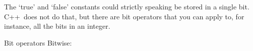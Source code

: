 The `true' and `false' constants could strictly speaking be stored in
a single bit. C++~does not do that, but there are bit
operators that you can apply to, for instance, all the bits in an integer.

\begin{block}{Bit operators}
  \label{sl:bit-oper}
 Bitwise: \n{& | ^}
\end{block}

\begin{comment}
  \Level 1 {Type conversions}

  Since a variable has one type, and will always be of that type,
  you may wonder what happens with
  \begin{lstlisting}
    float x = 1.5;
    int i;
    i = x;
  \end{lstlisting}
  or 
  \begin{lstlisting}
    int i = 6;
    float x;
    x = i;
  \end{lstlisting}

  \begin{itemize}
  \item Assigning a floating point value to an integer truncates the
    latter.
  \item Assigning an integer to a floating point variable fills it up
    with zeros after the decimal point.
  \end{itemize}

  \begin{exercise}
    \label{ex:float-convert}
    \begin{itemize}
    \item What happens when you assign a positive floating
      point value to an integer variable?
    \item What happens when you assign a negative floating
      point value to an integer variable?
    \item What happens when you assign a \lstinline{float} to a \lstinline{double}? 
      Try various numbers for the original float. Can you explain the
      result?
      (Hint: think about the conversion between binary and decimal.)
    \end{itemize}
  \end{exercise}

  The rules for type conversion in expressions are not entirely
  logical. Consider
  \begin{lstlisting}
    float x; int i=5,j=2;
    x = i/j;
  \end{lstlisting}
  This will give~\n{2} and not~\n{2.5}, because \n{i/j} is an integer
  expression and is therefore completely evaluated as such, giving~\n{2}
  after truncation. The fact
  that it is ultimately assigned to a floating point variable does not
  cause it to be evaluated as a computation on floats.


\end{comment}
